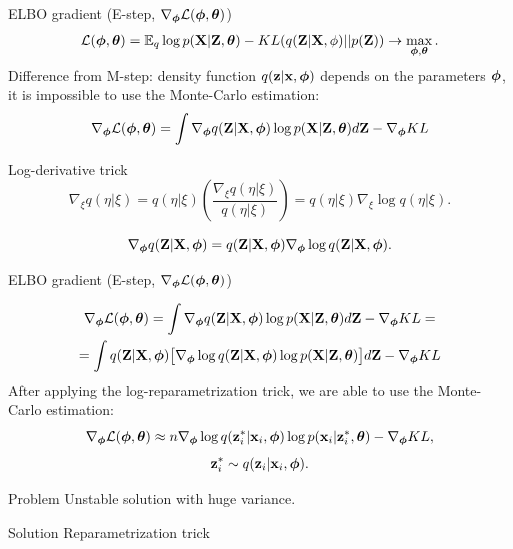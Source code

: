 \begin{frame}{ELBO gradient (E-step, $\nabla_{\boldsymbol{\phi}} \mathcal{L}(\boldsymbol{\phi}, \boldsymbol{\theta})$)}
\vspace{-0.3cm}
\[
	\mathcal{L} (\boldsymbol{\phi}, \boldsymbol{\theta})  = \mathbb{E}_{q} \log p(\mathbf{X} | \mathbf{Z}, \boldsymbol{\theta}) - KL (q(\mathbf{Z}| \mathbf{X}, \phi) || p(\mathbf{Z})) \rightarrow \max_{\boldsymbol{\phi}, \boldsymbol{\theta}}.
\]
	Difference from M-step: density function $q(\mathbf{z}| \mathbf{x}, \boldsymbol{\phi})$ depends on the parameters $\boldsymbol{\phi}$, it is impossible to use the Monte-Carlo estimation:
	\[
		\nabla_{\boldsymbol{\phi}} \mathcal{L} (\boldsymbol{\phi}, \boldsymbol{\theta}) = \int \nabla_{\boldsymbol{\phi}} q(\mathbf{Z}| \mathbf{X}, \boldsymbol{\phi}) \log p(\mathbf{X} |\mathbf{Z}, \boldsymbol{\theta}) d\mathbf{Z} - \nabla_{\boldsymbol{\phi}} KL
	\]
	
	\begin{block}{Log-derivative trick}
	    \[
	    \nabla_\xi q(\eta| \xi) = q(\eta | \xi) \left( \frac{\nabla_\xi q(\eta | \xi)}{q(\eta| \xi)} \right) = q(\eta | \xi) \nabla_\xi \log q(\eta| \xi).
	    \]
	\end{block}
	\[
		\nabla_{\boldsymbol{\phi}} q(\mathbf{Z}| \mathbf{X}, \boldsymbol{\phi}) = q(\mathbf{Z}| \mathbf{X}, \boldsymbol{\phi}) \nabla_{\boldsymbol{\phi}} \log q(\mathbf{Z}| \mathbf{X}, \boldsymbol{\phi}).
	\]
\end{frame}
\begin{frame}{ELBO gradient (E-step, $\nabla_{\boldsymbol{\phi}} \mathcal{L}(\boldsymbol{\phi}, \boldsymbol{\theta})$)}

	\begin{multline*}
		\nabla_{\boldsymbol{\phi}} \mathcal{L} (\boldsymbol{\phi}, \boldsymbol{\theta}) = \int \nabla_{\boldsymbol{\phi}} q(\mathbf{Z}| \mathbf{X}, \boldsymbol{\phi}) \log p(\mathbf{X} |\mathbf{Z}, \boldsymbol{\theta}) d\mathbf{Z}  - \nabla_{\boldsymbol{\phi}} KL = \\ 
		=  \int q(\mathbf{Z}| \mathbf{X}, \boldsymbol{\phi}) \bigl[  \nabla_{\boldsymbol{\phi}} \log q(\mathbf{Z}| \mathbf{X}, \boldsymbol{\phi}) \log p(\mathbf{X} |\mathbf{Z}, \boldsymbol{\theta}) \bigr] d\mathbf{Z} - \nabla_{\boldsymbol{\phi}} KL
	\end{multline*}
	After applying the log-reparametrization trick, we are able to use the Monte-Carlo estimation:
	\[
		\nabla_{\boldsymbol{\phi}} \mathcal{L} (\boldsymbol{\phi}, \boldsymbol{\theta}) \approx n \nabla_{\boldsymbol{\phi}} \log q(\mathbf{z}_i^*| \mathbf{x}_i, \boldsymbol{\phi}) \log p(\mathbf{x}_i |\mathbf{z}_i^*, \boldsymbol{\theta}) - \nabla_{\boldsymbol{\phi}} KL,
	\]
	\[
		\mathbf{z}_i^* \sim q(\mathbf{z}_i| \mathbf{x}_i, \boldsymbol{\phi}).
	\]
	\vspace{-0.2cm}
	\begin{block}{Problem} 
	Unstable solution with huge variance.
	\end{block}
	\begin{block}{Solution}
	    Reparametrization trick
	\end{block}
\end{frame}

